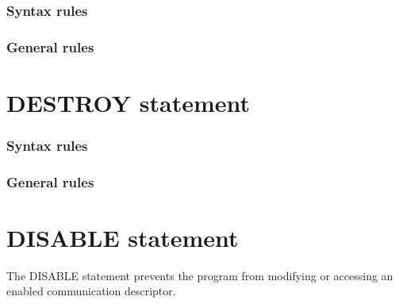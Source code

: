 \subsubsection{Syntax rules}

\subsubsection{General rules}

\section{DESTROY statement}

\begin{syntax}[\miscextcolour]
\end{syntax}

\subsubsection{Syntax rules}

\subsubsection{General rules}

\section{DISABLE statement}

The DISABLE statement prevents the program from modifying or accessing an enabled communication descriptor.

\begin{syntax}[\deletedcolour]
\end{syntax}

